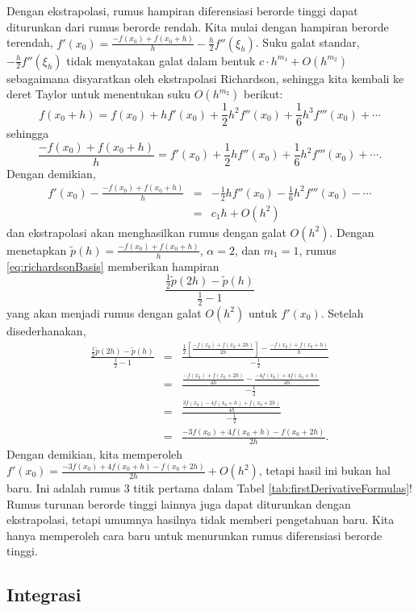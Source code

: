 Dengan ekstrapolasi, rumus hampiran diferensiasi berorde tinggi dapat
diturunkan dari rumus berorde rendah. Kita mulai dengan hampiran berorde
terendah, ${\displaystyle f'(x_{0})=\frac{-f(x_{0})+f(x_{0}+h)}{h}-\frac{h}{2}f''(\xi_{h})}$.
Suku galat standar, $-\frac{h}{2}f''(\xi_{h})$ tidak menyatakan galat
dalam bentuk $c\cdot h^{m_{1}}+O(h^{m_{2}})$ sebagaimana disyaratkan
oleh ekstrapolasi Richardson, sehingga kita kembali ke deret Taylor
untuk menentukan suku $O(h^{m_{2}})$ berikut:
\[
f(x_{0}+h)=f(x_{0})+hf'(x_{0})+\frac{1}{2}h^{2}f''(x_{0})+\frac{1}{6}h^{3}f'''(x_{0})+\cdots
\]
sehingga
\[
\frac{-f(x_{0})+f(x_{0}+h)}{h}=f'(x_{0})+\frac{1}{2}hf''(x_{0})+\frac{1}{6}h^{2}f'''(x_{0})+\cdots.
\]
Dengan demikian, 
\begin{eqnarray*}
f'(x_{0})-\frac{-f(x_{0})+f(x_{0}+h)}{h} & = & -\frac{1}{2}hf''(x_{0})-\frac{1}{6}h^{2}f'''(x_{0})-\cdots\\
 & = & c_{1}h+O(h^{2})
\end{eqnarray*}
dan ekstrapolasi akan menghasilkan rumus dengan galat $O(h^{2})$.
Dengan menetapkan $\tilde{p}(h)=\frac{-f(x_{0})+f(x_{0}+h)}{h}$,
$\alpha=2$, dan $m_{1}=1$, rumus \ref{eq:richardsonBasis} memberikan
hampiran
\[
\frac{\frac{1}{2}\tilde{p}(2h)-\tilde{p}(h)}{\frac{1}{2}-1}
\]
yang akan menjadi rumus dengan galat $O(h^{2})$ untuk $f'(x_{0})$.
Setelah disederhanakan,
\begin{eqnarray*}
\frac{\frac{1}{2}\tilde{p}(2h)-\tilde{p}(h)}{\frac{1}{2}-1} & = & \frac{\frac{1}{2}\left[\frac{-f(x_{0})+f(x_{0}+2h)}{2h}\right]-\frac{-f(x_{0})+f(x_{0}+h)}{h}}{-\frac{1}{2}}\\
 & = & \frac{\frac{-f(x_{0})+f(x_{0}+2h)}{4h}-\frac{-4f(x_{0})+4f(x_{0}+h)}{4h}}{-\frac{1}{2}}\\
 & = & \frac{\frac{3f(x_{0})-4f(x_{0}+h)+f(x_{0}+2h)}{4h}}{-\frac{1}{2}}\\
 & = & \frac{-3f(x_{0})+4f(x_{0}+h)-f(x_{0}+2h)}{2h}.
\end{eqnarray*}
Dengan demikian, kita memperoleh $f'(x_{0})=\frac{-3f(x_{0})+4f(x_{0}+h)-f(x_{0}+2h)}{2h}+O(h^{2})$,
tetapi hasil ini bukan hal baru. Ini adalah rumus 3 titik pertama
dalam Tabel \ref{tab:firstDerivativeFormulas}! Rumus turunan berorde
tinggi lainnya juga dapat diturunkan dengan ekstrapolasi, tetapi umumnya
hasilnya tidak memberi pengetahuan baru. Kita hanya memperoleh cara
baru untuk menurunkan rumus diferensiasi berorde tinggi.

\subsection{Integrasi}

